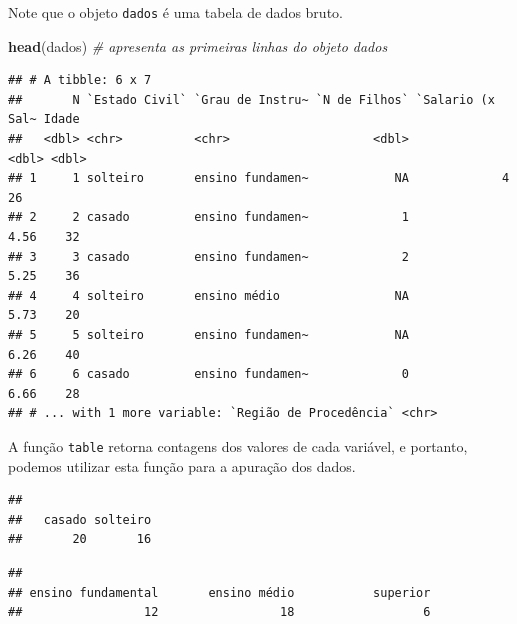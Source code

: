 \documentclass[nofonts,]{tufte-handout}
\newenvironment{Shaded}{\begin{snugshade}}{\end{snugshade}}
\newcommand{\CommentTok}[1]{\textcolor[rgb]{0.56,0.35,0.01}{\textit{#1}}}
\newcommand{\DataTypeTok}[1]{\textcolor[rgb]{0.13,0.29,0.53}{#1}}
\newcommand{\KeywordTok}[1]{\textcolor[rgb]{0.13,0.29,0.53}{\textbf{#1}}}
\newcommand{\NormalTok}[1]{#1}
\newcommand{\OperatorTok}[1]{\textcolor[rgb]{0.81,0.36,0.00}{\textbf{#1}}}
\newcommand{\StringTok}[1]{\textcolor[rgb]{0.31,0.60,0.02}{#1}}
\begin{document}
Note que o objeto \texttt{dados} é uma tabela de dados bruto.

\begin{Shaded}
\begin{Highlighting}[]
\KeywordTok{head}\NormalTok{(dados) }\CommentTok{# apresenta as primeiras linhas do objeto dados}
\end{Highlighting}
\end{Shaded}

\begin{verbatim}
## # A tibble: 6 x 7
##       N `Estado Civil` `Grau de Instru~ `N de Filhos` `Salario (x Sal~ Idade
##   <dbl> <chr>          <chr>                    <dbl>            <dbl> <dbl>
## 1     1 solteiro       ensino fundamen~            NA             4       26
## 2     2 casado         ensino fundamen~             1             4.56    32
## 3     3 casado         ensino fundamen~             2             5.25    36
## 4     4 solteiro       ensino médio                NA             5.73    20
## 5     5 solteiro       ensino fundamen~            NA             6.26    40
## 6     6 casado         ensino fundamen~             0             6.66    28
## # ... with 1 more variable: `Região de Procedência` <chr>
\end{verbatim}

A função \texttt{table} retorna contagens dos valores de cada variável,
e portanto, podemos utilizar esta função para a apuração dos dados.

\begin{Shaded}
\end{Shaded}

\begin{verbatim}
## 
##   casado solteiro 
##       20       16
\end{verbatim}

\begin{Shaded}
\end{Shaded}

\begin{verbatim}
## 
## ensino fundamental       ensino médio           superior 
##                 12                 18                  6
\end{verbatim}
\end{document}
